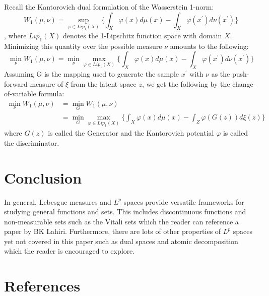 \documentclass[12pt]{amsart}
\theoremstyle{plain}
\theoremstyle{definition}
\theoremstyle{remark}
\numberwithin{equation}{section}
\numberwithin{thm}{section}
\begin{document}
Recall the Kantorovich dual formulation of the Wasserstein 1-norm:
\begin{equation}
    W_{1}(\mu,\nu) = \sup_{ \varphi \in Lip_{1}(X)}\{ \int_{X}\varphi(x)d\mu(x)-\int_{X} \varphi(x^{'})d\nu(x^{'})  \}
\end{equation}, where $Lip_{1}(X)$ denotes the 1-Lipschitz function space with domain $X$. 
Minimizing this quantity over the possible measure $\nu$ amounts to the following:
\begin{equation}
    \min_{\nu}W_{1}(\mu,\nu) = \min_{\nu} \max_{\varphi \in Lip_{1}(X)}\{ \int_{X} \varphi(x)d\mu(x) - \int_{X} \varphi(x^{'})d\nu(x^{'}) \}
\end{equation}
Assuming G is the mapping used to generate the sample $x^{'}$ with $\nu$ as the push-forward measure of $\xi$ from the latent space $z$, we get the following by the change-of-variable formula:
\begin{equation}
\begin{aligned}
    \min_{\nu} W_{1}(\mu,\nu) & =  \min_{G} W_{1}(\mu,\nu) \\
    & = \min_{G} \max_{\varphi \in Lip_{1}(X)} \{\int_{X}\varphi(x)d\mu(x)-\int_{Z} \varphi(G(z))d\xi(z) \}    
\end{aligned}
\end{equation}
where $G(z)$ is called the Generator and the Kantorovich potential $\varphi$ is called the discriminator.



\section{\textbf{Conclusion}}\label{sec:conclusion}
In general, Lebesgue measures and $L^p$ spaces provide versatile frameworks for studying general functions and sets. This includes discontinuous functions and non-measurable sets such as the Vitali sets which the reader can reference a paper by BK Lahiri. Furthermore, there are lots of other properties of $L^p$ spaces yet not covered in this paper such as dual spaces and atomic decomposition which the reader is encouraged to explore.

\section{\textbf{References}}
\end{document}
